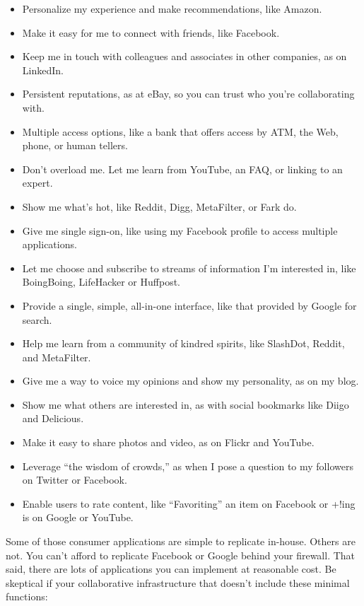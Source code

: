 \begin{itemize}
\item
  Personalize my experience and make recommendations, like Amazon.
\item
  Make it easy for me to connect with friends, like Facebook.
\item
  Keep me in touch with colleagues and associates in other companies, as
  on LinkedIn.
\item
  Persistent reputations, as at eBay, so you can trust who you're
  collaborating with.
\item
  Multiple access options, like a bank that offers access by ATM, the
  Web, phone, or human tellers.
\item
  Don't overload me. Let me learn from YouTube, an FAQ, or linking to an
  expert.
\item
  Show me what's hot, like Reddit, Digg, MetaFilter, or Fark do.
\item
  Give me single sign-on, like using my Facebook profile to access
  multiple applications.
\item
  Let me choose and subscribe to streams of information I'm interested
  in, like BoingBoing, LifeHacker or Huffpost.
\item
  Provide a single, simple, all-in-one interface, like that provided by
  Google for search.
\item
  Help me learn from a community of kindred spirits, like SlashDot,
  Reddit, and MetaFilter.
\item
  Give me a way to voice my opinions and show my personality, as on my
  blog.
\item
  Show me what others are interested in, as with social bookmarks like
  Diigo and Delicious.
\item
  Make it easy to share photos and video, as on Flickr and YouTube.
\item
  Leverage ``the wisdom of crowds,'' as when I pose a question to my
  followers on Twitter or Facebook.
\item
  Enable users to rate content, like ``Favoriting'' an item on Facebook
  or +!ing is on Google or YouTube.
\end{itemize}
Some of those consumer applications are simple to replicate in-house.
Others are not. You can't afford to replicate Facebook or Google behind
your firewall. That said, there are lots of applications you can
implement at reasonable cost. Be skeptical if your collaborative
infrastructure that doesn't include these minimal functions:

